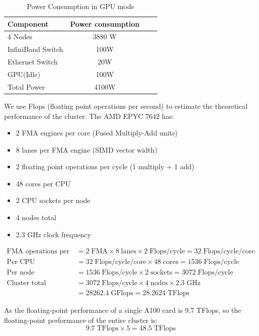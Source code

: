 \documentclass[a4paper,12pt]{article}
\begin{document}
\begin{table}[H]
\centering
\vspace{0.5cm}
\begin{tabular}{lccc}  %
\toprule
Component & Power consumption \\
\midrule
4 Nodes & 3880 W \\
InfiniBand Switch & 100W \\
Ethernet Switch & 20W \\
GPU(Idle) & 100W \\
Total Power & 4100W \\
\bottomrule
\end{tabular}
\caption{Power Consumption in GPU mode}
\end{table}

We use Flops (floating point operations per second) to estimate the theoretical performance of the cluster.
The AMD EPYC 7642 has:
\begin{itemize}
    \item 2 FMA engines per core (Fused Multiply-Add units)
    \item 8 lanes per FMA engine (SIMD vector width)  
    \item 2 floating point operations per cycle (1 multiply + 1 add)
    \item 48 cores per CPU
    \item 2 CPU sockets per node
    \item 4 nodes total
    \item 2.3 GHz clock frequency
\end{itemize}

\begin{align*}
\text{FMA operations per cycle} &= 2\;\text{FMA} \times 8\;\text{lanes} \times 2\;\text{Flops/cycle} = 32\;\text{Flops/cycle/core} \\
\text{Per CPU} &= 32\;\text{Flops/cycle/core} \times 48\;\text{cores} = 1536\;\text{Flops/cycle} \\
\text{Per node} &= 1536\;\text{Flops/cycle} \times 2\;\text{sockets} = 3072\;\text{Flops/cycle} \\
\text{Cluster total} &= 3072\;\text{Flops/cycle} \times 4\;\text{nodes} \times 2.3\;\text{GHz} \\
&= 28262.4\;\text{GFlops} = 28.2624\;\text{TFlops}
\end{align*}

As the floating-point performance of a single A100 card is 9.7 TFlops, so the floating-point performance of the entire cluster is:
\begin{equation*}
9.7\;\text{TFlops} \times 5 = 48.5 \;\text{TFlops}
\end{equation*}
\end{document}
